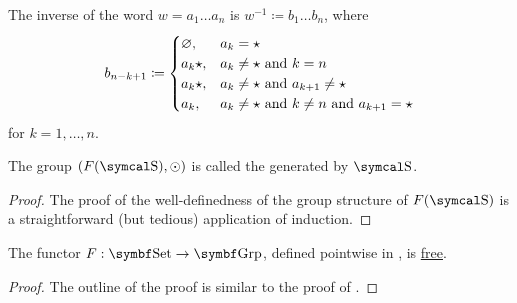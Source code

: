 \begin{definition}
  The inverse of the word \( w = a_1 \ldots a_n \) is \( w^{-1} \coloneqq b_1 \ldots b_n \), where
   \begin{equation}\label{eq:def:free_group/inverse}
     b_{n-k+1} \coloneqq \begin{cases}
       \varnothing, &a_k = {\star} \\
       a_k{\star},  &a_k \neq {\star} \text{ and } k = n \\
       a_k{\star},  &a_k \neq {\star} \text{ and } a_{k+1} \neq {\star} \\
       a_k,         &a_k \neq {\star} \text{ and } k \neq n \text{ and } a_{k+1} = {\star} \\
     \end{cases}
   \end{equation}
   for \( k = 1, \ldots, n \).

  The group \( (F(\CS), \odot) \) is called the  generated by \( \CS \).
\end{definition}
\begin{proof}
  The proof of the well-definedness of the group structure of \( F(\CS) \) is a straightforward (but tedious) application of induction\IND.
\end{proof}

\begin{proposition}\label{thm:free_group_is_free_functor}
  The functor \( F: \Cat{Set} \to \Cat{Grp} \), defined pointwise in , is \hyperref[def:free_functor]{free}.
\end{proposition}
\begin{proof}
  The outline of the proof is similar to the proof of .
\end{proof}

